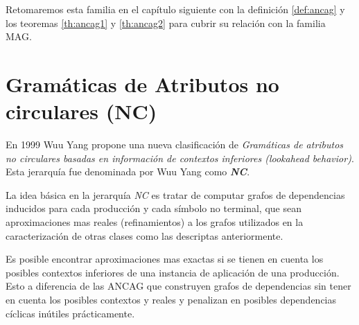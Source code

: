 Retomaremos esta familia en el capítulo siguiente con la definición \ref{def:ancag} y los teoremas \ref{th:ancag1} y \ref{th:ancag2} para cubrir su relación con la familia MAG.

\section{Gramáticas de Atributos no circulares (NC)}
\label{sec:gramNC}
En 1999 Wuu Yang\cite{wuu-yang2} propone una nueva clasificación de \emph{Gramáticas de atributos no circulares basadas en información de contextos inferiores (lookahead behavior)}. Esta jerarquía fue denominada por Wuu Yang como  \emph{\textbf{NC}}.

La idea básica en la jerarquía \emph{NC} es tratar de computar grafos de dependencias inducidos para cada producción y cada símbolo no terminal, que sean aproximaciones mas reales (refinamientos) a los grafos utilizados en la caracterización de otras clases como las descriptas anteriormente. 

Es posible encontrar aproximaciones mas exactas si se tienen en cuenta los posibles contextos inferiores de una instancia de aplicación de una producción. Esto a diferencia de las ANCAG que construyen grafos de dependencias sin tener en cuenta los posibles contextos y reales y penalizan en posibles dependencias cíclicas inútiles prácticamente. 

